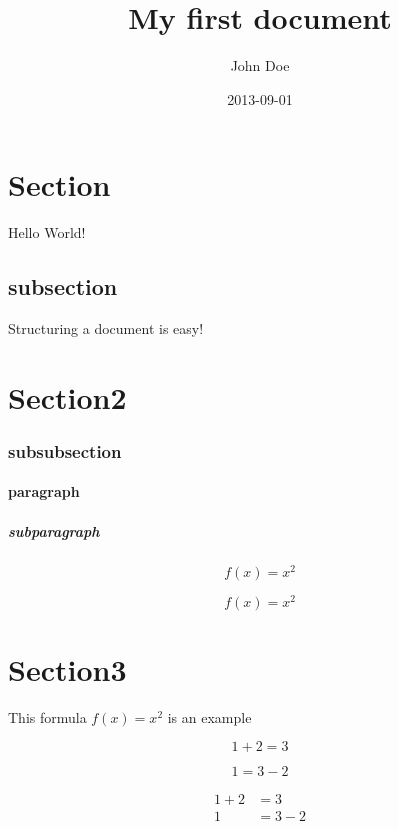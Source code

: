 \documentclass{article}
\title{My first document}
\date{2013-09-01}
\author{John Doe}
\begin{document}
	
	\maketitle
	\newpage
	\doublespacing
	\tableofcontents
	\singlespacing
	\newpage

	\section{Section}

	Hello World!

	\subsection{subsection}
	Structuring a document is easy!

	\section{Section2}

	\subsubsection{subsubsection}

	\paragraph{paragraph}
	\subparagraph{subparagraph}
	\begin{equation}  
		f(x) = x^2
	\end{equation}

	\begin{equation*}  %
		f(x) = x^2
	\end{equation*}
	\section{Section3}

	This formula $f(x) = x^2$ is an example

	\begin{equation*}
		1+2 = 3
	\end{equation*}

	\begin{equation*}
		1 = 3-2
	\end{equation*}

	\begin{align*}
		1+2 &= 3\\
		1&= 3-2
	\end{align*}
\end{document}
